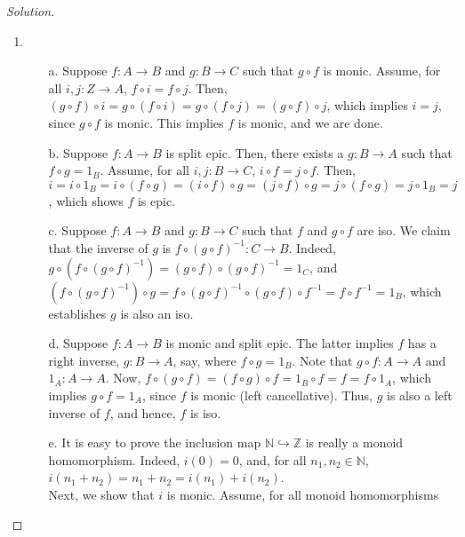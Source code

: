 \documentclass[]{amsbook}
\newcommand{\N}{\mathbb{N}}
\newcommand{\Z}{\mathbb{Z}}
\newcommand{\0}{\mathbf{0}}
\newcommand{\1}{\mathbf{1}}
\newenvironment{solution}
    {\begin{proof}[Solution]}{\end{proof}}
\begin{document}
\begin{solution}
    \leavevmode
    \begin{enumerate}
        \item \leavevmode
        \begin{itemize}
            \item[a.] Suppose $f: A \to B$ and $g: B \to C$ such that
            $g \circ f$ is monic. Assume, for all $i, j: Z \to A$,
            $f \circ i = f \circ j$. Then, $(g \circ f) \circ i = g \circ
            (f \circ i) = g \circ (f \circ j) = (g \circ f) \circ j$, which
            implies $i = j$, since $g \circ f$ is monic. This implies $f$ is
            monic, and we are done.
            \item[b.] Suppose $f: A \to B$ is split epic. Then, there exists a
            $g: B \to A$ such that $f \circ g = 1_B$. Assume, for all $i, j: B
            \to C$, $i \circ f = j \circ f$. Then, $i = i \circ 1_B = i \circ
            (f \circ g) = (i \circ f) \circ g = (j \circ f) \circ g = j \circ
            (f \circ g) = j \circ 1_B = j$, which shows $f$ is epic.
            \item[c.] Suppose $f: A \to B$ and $g: B \to C$ such that $f$ and
            $g \circ f$ are iso. We claim that the inverse of $g$ is
            $f \circ (g \circ f)^{-1}: C \to B$. Indeed, $g \circ (f \circ
            (g \circ f)^{-1}) = (g \circ f) \circ (g \circ f)^{-1} = 1_C$, and
            $(f \circ (g \circ f)^{-1}) \circ g = f \circ (g \circ f)^{-1} \circ
            (g \circ f) \circ f^{-1} = f \circ f^{-1} = 1_B$, which establishes
            $g$ is also an iso.
            \item[d.] Suppose $f: A \to B$ is monic and split epic. The latter
            implies $f$ has a right inverse, $g: B \to A$, say, where $f \circ g
            = 1_B$. Note that $g \circ f: A \to A$ and $1_A: A \to A$. Now,
            $f \circ (g \circ f) = (f \circ g) \circ f = 1_B \circ f = f = f
            \circ 1_A$, which implies $g \circ f = 1_A$, since $f$ is monic
            (left cancellative). Thus, $g$ is also a left inverse of $f$, and
            hence, $f$ is iso.
            \item[e.] It is easy to prove the inclusion map $\N \hookrightarrow
            \Z$ is really a monoid homomorphism. Indeed, $i(0) = 0$, and, for all
            $n_1, n_2 \in \N$, $i(n_1 + n_2) = n_1 + n_2 = i(n_1) + i(n_2)$.\\
            Next, we show that $i$ is monic. Assume, for all monoid homomorphisms

\end{itemize}
\end{enumerate}
\end{solution}
\end{document}
